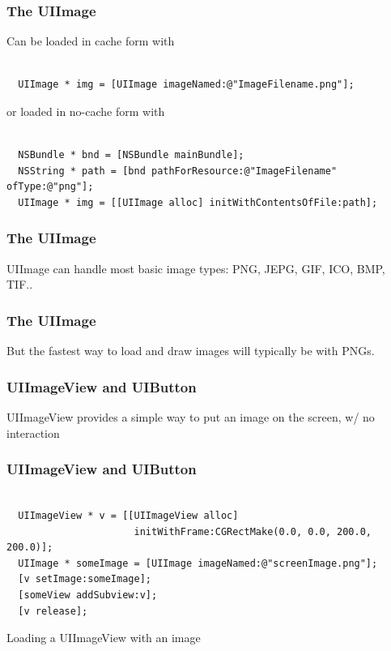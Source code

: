 \documentclass[10pt]{beamer}
\begin{document}
\begin{frame}[fragile]
  \frametitle{The UIImage}
  Can be loaded in cache form with \begin{verbatim}

  UIImage * img = [UIImage imageNamed:@"ImageFilename.png"];

  \end{verbatim}
or loaded in no-cache form with \begin{verbatim}

  NSBundle * bnd = [NSBundle mainBundle];
  NSString * path = [bnd pathForResource:@"ImageFilename" ofType:@"png"];
  UIImage * img = [[UIImage alloc] initWithContentsOfFile:path];

  \end{verbatim}

\end{frame}

\begin{frame}[fragile]
  \frametitle{The UIImage}
  UIImage can handle most basic image types: PNG, JEPG, GIF, ICO, BMP, TIF..

\end{frame}

\begin{frame}[fragile]
  \frametitle{The UIImage}
  But the fastest way to load and draw images will typically be with PNGs.

\end{frame}

    
\begin{frame}[fragile]
  \frametitle{UIImageView and UIButton}
  UIImageView provides a simple way to put an image on the screen, w/ no interaction

\end{frame}

\begin{frame}[fragile]
  \frametitle{UIImageView and UIButton}
  \begin{listing}[H]
    \begin{verbatim}

  UIImageView * v = [[UIImageView alloc]
                      initWithFrame:CGRectMake(0.0, 0.0, 200.0, 200.0)];
  UIImage * someImage = [UIImage imageNamed:@"screenImage.png"];
  [v setImage:someImage];
  [someView addSubview:v];
  [v release];

  \end{verbatim}
    \caption{Loading a UIImageView with an image}
    \label{listing:27}
  \end{listing}

\end{frame}
\end{document}
